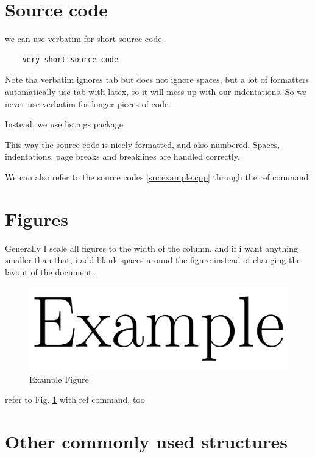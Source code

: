 \documentclass{article}
\begin{document}
\section{Source code}

we can use verbatim for short source code

\begin{verbatim}
    very short source code
\end{verbatim}

Note tha verbatim ignores tab but does not ignore spaces, but a lot of formatters automatically use tab with latex, so it will mess up with our indentations.
So we never use verbatim for longer pieces of code.

Instead, we use listings package



This way the source code is nicely formatted, and also numbered.
Spaces, indentations, page breaks and breaklines are handled correctly.

We can also refer to the source codes \ref{src:example.cpp} through the ref command.

\section{Figures}

Generally I scale all figures to the width of the column, and if i want anything smaller than that, i add blank spaces around the figure instead of changing the layout of the document.

\begin{figure}
	\begin{center}
		\includegraphics[width=0.75\columnwidth]{figs/example.png}
	\end{center}
	\caption{Example Figure}
	\label{fig:example.png}
\end{figure}

refer to Fig. \ref{fig:example.png} with ref command, too

\section{Other commonly used structures}
\end{document}

